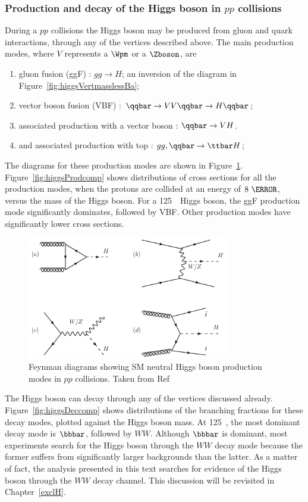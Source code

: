\subsubsection{Production and decay of the Higgs boson in $pp$ collisions}
\label{sec:smHdecay}
\par During a $pp$ collisions the Higgs boson may be produced from gluon and quark interactions, 
through any of the vertices described above. The main production modes, where $V$ represents a $\Wpm$ or a $\Zboson$, are 
\begin{enumerate}
\item gluon fusion (ggF) : $gg\to H$; an inversion of the diagram in Figure~\ref{fig:higgsVertmasslessBa};
\item vector boson fusion (VBF) : $\qqbar\to VV\qqbar\to H\qqbar$;
\item associated production with a vector boson : $\qqbar\to VH$.
\item and associated production with top : $gg,\qqbar\to \ttbar H$; 
\end{enumerate}
The diagrams for these production modes are shown in Figure~\ref{fig:higgsProd}. Figure~\ref{fig:higgsProdcomp} shows 
distributions of cross sections for all the production modes, when the protons are collided at an energy 
of $8~\TeV$, versus the mass of the Higgs boson. For a 125~\GeV\ Higgs boson, the ggF production mode significantly dominates, followed by   
VBF. Other production modes have significantly lower cross sections. 

\begin{figure}[!h]
\centering
   \includegraphics[width=0.8\textwidth]{figures/h-prod.png}
\caption{Feynman diagrams showing SM neutral Higgs boson production modes in $pp$ collisions. Taken from Ref~\cite{Ghosh:2012ep}}
\label{fig:higgsProd}
\end{figure}

\par The Higgs boson can decay through any of the vertices discussed already. Figure~\ref{fig:higgsDeccomp} 
shows distributions of the branching fractions for these decay modes, plotted against the 
Higgs boson mass. At 125~\GeV, the most dominant decay mode is $\bbbar$, followed by $WW$. 
Although $\bbbar$ is dominant, most experiments search for the Higgs boson through the $WW$ 
decay mode because the former suffers from significantly larger backgrounds than the latter. 
As a matter of fact, the analysis presented in this text searches for evidence of the Higgs 
boson through the $WW$ decay channel. This discussion will be revisited in Chapter~\ref{exclH}.

